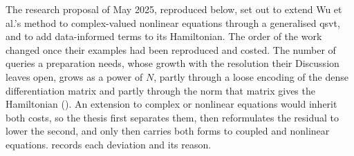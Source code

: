 %


The research proposal of May 2025, reproduced below, set out to extend Wu et al.'s method to complex-valued nonlinear equations through a generalised \gls{qsvt}, and to add data-informed terms to its Hamiltonian. The order of the work changed once their examples had been reproduced and costed. The number of queries a preparation needs, whose growth with the resolution their Discussion leaves open, grows as a power of $N$, partly through a loose encoding of the dense differentiation matrix and partly through the norm that matrix gives the Hamiltonian (). An extension to complex or nonlinear equations would inherit both costs, so the thesis first separates them, then reformulates the residual to lower the second, and only then carries both forms to coupled and nonlinear equations.  records each deviation and its reason.

